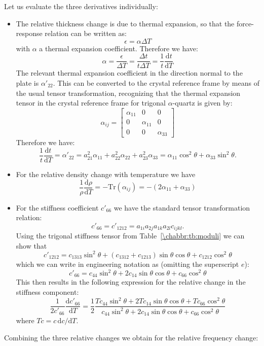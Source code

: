 Let us evaluate the three derivatives individually:
\begin{itemize}
	\item The relative thickness change is due to thermal expansion, so that the force-response relation can be written as:
	\[
		\epsilon = \alpha\Delta T
	\]
	with $\alpha$ a thermal expansion coefficient. Therefore we have:
	\[
		\alpha = \frac{\epsilon}{\Delta T}=\frac{\Delta t}{t\Delta T}=\frac{1}{t}\frac{\mathrm{d}t}{\mathrm{d}T}
	\]
	The relevant thermal expansion coefficient in the direction normal to the plate is $\alpha'_{22}$. This can be converted to the crystal reference frame by means of the usual tensor transformation, recognizing that the thermal expansion tensor in the crystal reference frame for trigonal $\alpha$-quartz is given by:
	\[
		\alpha_{ij} = \left[ \begin{array}{ccc}\alpha_{11}&0&0\\ 0&\alpha_{11}&0\\ 0&0&\alpha_{33}\end{array}\right]
	\]
	Therefore we have:
	\[	\frac{1}{t}\frac{\mathrm{d}t}{\mathrm{d}T} = \alpha'_{22} = a^2_{21}\alpha_{11}+a^2_{22}\alpha_{22}+a^2_{23}\alpha_{33}
	= \alpha_{11}\cos^2\theta+\alpha_{33}\sin^2\theta.
	\]
	
	\item For the relative density change with temperature we have
	\[
		\frac{1}{\rho}\frac{\mathrm{d}\rho}{\mathrm{d}T} = -\text{Tr}(\alpha_{ij}) = -(2\alpha_{11}+\alpha_{33})
	\]
	
	\item For the stiffness coefficient $c'_{66}$ we have the standard tensor transformation relation:
	\[
		c'_{66} = c'_{1212} = a_{1i}a_{2j}a_{1k}a_{2l}c_{ijkl}.
	\]
	Using the trigonal stiffness tensor from Table~\ref{\chabbr:tb:moduli} we can show that 
	\[
		c'_{1212} = c_{1313}\sin^2\theta+(c_{1312}+c_{1213})\sin\theta\cos\theta+c_{1212}\cos^2\theta
	\]
	which we can write in engineering notation as (omitting the superscript $e$):
	\[
		c'_{66} = c_{44}\sin^2\theta + 2c_{14}\sin\theta\cos\theta + c_{66}\cos^2\theta
	\]
	This then results in the following expression for the relative change in the stiffness component:
	\[
		\frac{1}{2c'_{66}}\frac{\mathrm{d}c'_{66}}{\mathrm{d}T} = \frac{1}{2}\frac{T\!c_{44}\sin^2\theta + 2T\!c_{14}\sin\theta\cos\theta + T\!c_{66}\cos^2\theta}{c_{44}\sin^2\theta + 2c_{14}\sin\theta\cos\theta + c_{66}\cos^2\theta}
	\]
	where $T\!c = c\,\mathrm{d}c/\mathrm{d}T$.
\end{itemize}
Combining the three relative changes we obtain for the relative frequency change:
